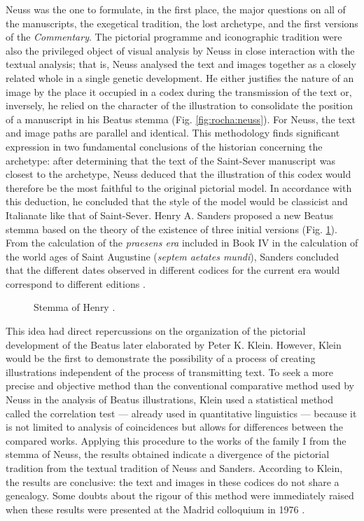 \begin{paper}
Neuss was the one to formulate, in the first place, the major questions
on all of the manuscripts, the exegetical tradition, the lost archetype,
and the first versions of the \emph{Commentary}. The pictorial programme
and iconographic tradition were also the privileged object of visual
analysis by Neuss in close interaction with the textual analysis; that
is, Neuss analysed the text and images together as a closely related
whole in a single genetic development. He either justifies the nature of
an image by the place it occupied in a codex during the transmission of
the text or, inversely, he relied on the character of the illustration
to consolidate the position of a manuscript in his Beatus stemma
(Fig. \ref{fig:rocha:neuss}). For Neuss, the text and image paths are parallel and
identical. This methodology finds significant expression in two
fundamental conclusions of the historian concerning the archetype: after
determining that the text of the Saint-Sever manuscript was closest to
the archetype, Neuss deduced that the illustration of this codex would
therefore be the most faithful to the original pictorial model. In
accordance with this deduction, he concluded that the style of the model
would be classicist and Italianate like that of Saint-Sever. Henry A.
Sanders proposed a new Beatus stemma based on the theory of the
existence of three initial versions (Fig. \ref{fig:rocha:sanders}). From the calculation of
the \emph{praesens era} included in Book IV in the calculation of the
world ages of Saint Augustine (\emph{septem aetates mundi}), Sanders
concluded that the different dates observed in different codices for the
current era would correspond to different editions \citep[1:165--167]{noauthor_actas_1978}.

\begin{figure}[H]
    \centering
    \caption{Stemma of Henry \citet{sanders_beati_1930}.}
    \label{fig:rocha:sanders}
\end{figure}

This idea had direct repercussions on the organization of the pictorial
development of the Beatus later elaborated by Peter K. Klein. However,
Klein would be the first to demonstrate the possibility of a process of
creating illustrations independent of the process of transmitting text.
To seek a more precise and objective method than the conventional
comparative method used by Neuss in the analysis of Beatus
illustrations, Klein used a statistical method called the correlation
test –– already used in quantitative linguistics –– because it is not
limited to analysis of coincidences but allows for differences between
the compared works. Applying this procedure to the works of the family I
from the stemma of Neuss, the results obtained indicate a
divergence of the pictorial tradition from the textual tradition of
Neuss and Sanders. According to Klein, the results are conclusive: the
text and images in these codices do not share a genealogy. Some doubts
about the rigour of this method were immediately raised when these
results were presented at the Madrid colloquium in 1976 \citep[2:107--115]{noauthor_actas_1978}.


\end{paper}
